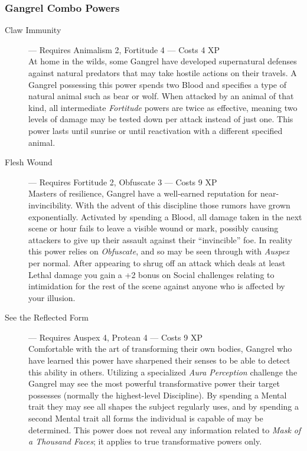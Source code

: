 \subsubsection{Gangrel Combo Powers}
\begin{description}
	\item[Claw Immunity]--- Requires Animalism 2, Fortitude 4 --- Costs 4 XP \\
	At home in the wilds, some Gangrel have developed supernatural defenses against natural 
	predators that may take hostile actions on their travels.  A Gangrel possessing this 
	power spends two Blood and specifies a type of natural animal such as bear or wolf.  When 
	attacked by an animal of that kind, all intermediate \emph{Fortitude} powers are twice as 
	effective, meaning two levels of damage may be tested down per attack instead of just one.  
	This power lasts until sunrise or until reactivation with a different specified animal.
	\item[Flesh Wound]--- Requires Fortitude 2, Obfuscate 3 --- Costs 9 XP \\
	Masters of resilience, Gangrel have a well-earned reputation for near-invincibility.  With 
	the advent of this discipline those rumors have grown exponentially.  Activated by spending 
	a Blood, all damage taken in the next scene or hour fails to leave a visible wound or mark, 
	possibly causing attackers to give up their assault against their ``invincible'' foe.  In 
	reality this power relies on \emph{Obfuscate}, and so may be seen through with \emph{Auspex} per 
	normal.  After appearing to shrug off an attack which deals at least Lethal damage you gain a +2 
	bonus on Social challenges relating to intimidation for the rest of the scene against anyone who 
	is affected by your illusion.
	\item[See the Reflected Form]--- Requires Auspex 4, Protean 4 --- Costs 9 XP \\
	Comfortable with the art of transforming their own bodies, Gangrel who have learned this 
	power have sharpened their senses to be able to detect this ability in others.  Utilizing 
	a specialized \emph{Aura Perception} challenge the Gangrel may see the most powerful 
	transformative power their target possesses (normally the highest-level Discipline).  By spending 
	a Mental trait they may see all shapes the subject regularly uses, and by spending a second Mental 
	trait all forms the individual is capable of may be determined.  This power does not reveal any 
	information related to \emph{Mask of a Thousand Faces}; it applies to true transformative powers only.
\end{description}

